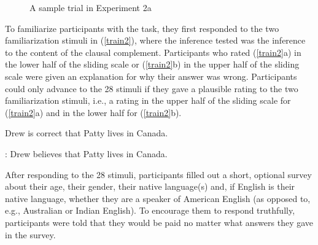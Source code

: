 \documentclass[11pt,fleqn]{article}
\newcommand{\6}{\mbox{$[\hspace*{-.6mm}[$}}
\newcommand{\9}{\mbox{$]\hspace*{-.6mm}]$}}
\begin{document}
\begin{figure}[H]
\begin{center}
\end{center}
\caption{A sample trial in Experiment 2a}\label{f-trial-exp3}
\end{figure}

To familiarize participants with the task, they first responded to the two familiarization stimuli in (\ref{train2}), where the inference tested was the inference to the content of the clausal complement. Participants who rated (\ref{train2}a) in the lower half of the sliding scale or (\ref{train2}b) in the upper half of the sliding scale were given an explanation for why their answer was wrong. Participants could only advance to the 28 stimuli if they gave a plausible rating to the two familiarization stimuli, i.e., a rating in the upper half of the sliding scale for (\ref{train2}a) and in the lower half for (\ref{train2}b).

\begin{exe}
\ex\label{train2}
\begin{xlist}
 Drew is correct that Patty lives in Canada. 

: Drew believes that Patty lives in Canada.
\end{xlist}
\end{exe}

After responding to the 28 stimuli, participants filled out a short, optional survey about their age, their gender, their native language(s) and, if English is their native language, whether they are a speaker of American English (as opposed to, e.g., Australian or Indian English). To encourage them to respond truthfully, participants were told that they would be paid no matter what answers they gave in the survey.
\end{document}
